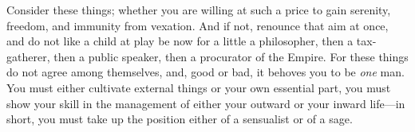 Consider  these  things; whether  you  are  willing at  such  a  price to  gain
serenity, freedom, and immunity from vexation. And if not, renounce that aim at
once, and do not like a child at play be now for a little a philosopher, then a
tax-gatherer, then a public speaker, then a procurator of the Empire. For these
things do not  agree among themselves, and,  good or bad, it behoves  you to be
\emph{one} man. You must either cultivate external things or your own essential
part, you must show your skill in the management of either your outward or your
inward life---in short, you must take up the position either of a sensualist or
of a sage.
